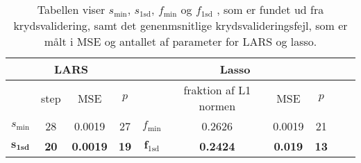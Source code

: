 \begin{table}
\center
\begin{tabular}{cccc | cccccc}
\toprule
   \multicolumn{4}{c}{LARS} &  \multicolumn{4}{c}{Lasso}  \\ \midrule
 & step & MSE & $p$ & & fraktion af L1 normen & MSE & $p$ \\
 $s_{\min}$ &28 & 0.0019 &27  &	$f_{\min}$ & 0.2626 & 0.0019 & 21\\ 
 $\mathbf{s}_{\textbf{1sd}}$ & \textbf{20}& \textbf{0.0019} & \textbf{19} & $\mathbf{f}_{\text{1sd}}$& \textbf{0.2424} & \textbf{0.019} & \textbf{13 } \\ \bottomrule 
 \end{tabular}
\caption{Tabellen viser $s_{\min}$, $s_{\text{1sd}}$, $f_{\min}$ og $f_{\text{1sd}}$ , som er fundet ud fra krydsvalidering, samt det genenmsnitlige krydsvalideringsfejl, som er målt i MSE og antallet af parameter for LARS og lasso.} \label{tab:cv_tab}
\end{table}
